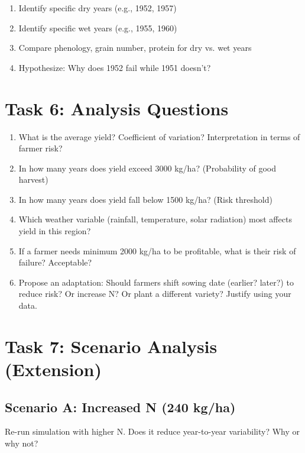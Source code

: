 \begin{enumerate}
  \item Identify specific dry years (e.g., 1952, 1957)
  \item Identify specific wet years (e.g., 1955, 1960)
  \item Compare phenology, grain number, protein for dry vs. wet years
  \item Hypothesize: Why does 1952 fail while 1951 doesn't?
\end{enumerate}

\section{Task 6: Analysis Questions}

\begin{enumerate}
  \item What is the average yield? Coefficient of variation? Interpretation in terms of farmer risk?
  
  \item In how many years does yield exceed 3000 kg/ha? (Probability of good harvest)
  
  \item In how many years does yield fall below 1500 kg/ha? (Risk threshold)
  
  \item Which weather variable (rainfall, temperature, solar radiation) most affects yield in this region?
  
  \item If a farmer needs minimum 2000 kg/ha to be profitable, what is their risk of failure? Acceptable?
  
  \item Propose an adaptation: Should farmers shift sowing date (earlier? later?) to reduce risk? Or increase N? Or plant a different variety? Justify using your data.
\end{enumerate}

\section{Task 7: Scenario Analysis (Extension)}

\subsection{Scenario A: Increased N (240 kg/ha)}

Re-run simulation with higher N. Does it reduce year-to-year variability? Why or why not?

